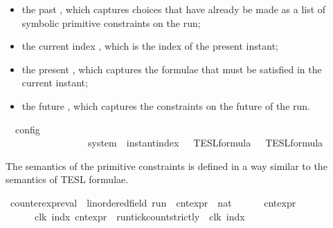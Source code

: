 \begin{isabellebody}
\begin{isamarkuptext}
%
\begin{itemize}%
\item the past \isa{{\isasymGamma}}, which captures choices that have already be made as a 
list of symbolic primitive constraints on the run;

\item the current index , which is the index of the present instant;

\item the present \isa{{\isasymPsi}}, which captures the formulae that must be satisfied
in the current instant;

\item the future \isa{{\isasymPhi}}, which captures the constraints on the future of the run.%
\end{itemize}%
\end{isamarkuptext}\isamarkuptrue%
\isamarkupfalse%
\ {\isacharprime}{\isasymtau}\ config\ {\isacharequal}\isanewline
\ \ \ \ \ \ \ \ \ \ \ \ \ \ \ \ {\isacartoucheopen}{\isacharprime}{\isasymtau}\ system\ {\isacharasterisk}\ instant{\isacharunderscore}index\ {\isacharasterisk}\ {\isacharprime}{\isasymtau}\ TESL{\isacharunderscore}formula\ {\isacharasterisk}\ {\isacharprime}{\isasymtau}\ TESL{\isacharunderscore}formula{\isacartoucheclose}%
\isadelimdocument
%
\endisadelimdocument
%
\isatagdocument
%
\isamarkuptrue%
%
\endisatagdocument
{\isafolddocument}%
%
\isadelimdocument
%
\endisadelimdocument
%
\begin{isamarkuptext}%
The semantics of the primitive constraints is defined in a way similar to
  the semantics of TESL formulae.%
\end{isamarkuptext}\isamarkuptrue%
\isamarkupfalse%
\ counter{\isacharunderscore}expr{\isacharunderscore}eval\ {\isacharcolon}{\isacharcolon}\ {\isacartoucheopen}{\isacharparenleft}{\isacharprime}{\isasymtau}{\isacharcolon}{\isacharcolon}linordered{\isacharunderscore}field{\isacharparenright}\ run\ {\isasymRightarrow}\ cnt{\isacharunderscore}expr\ {\isasymRightarrow}\ nat{\isacartoucheclose}\isanewline
\ \ {\isacharparenleft}{\isacartoucheopen}{\isasymlbrakk}\ {\isacharunderscore}\ {\isasymturnstile}\ {\isacharunderscore}\ {\isasymrbrakk}\isactrlsub c\isactrlsub n\isactrlsub t\isactrlsub e\isactrlsub x\isactrlsub p\isactrlsub r{\isacartoucheclose}{\isacharparenright}\isanewline
{}\isanewline
\ \ {\isacartoucheopen}{\isasymlbrakk}\ {\isasymrho}\ {\isasymturnstile}\ {\isacharhash}\isactrlsup {\isacharless}\ clk\ indx\ {\isasymrbrakk}\isactrlsub c\isactrlsub n\isactrlsub t\isactrlsub e\isactrlsub x\isactrlsub p\isactrlsub r\ {\isacharequal}\ run{\isacharunderscore}tick{\isacharunderscore}count{\isacharunderscore}strictly\ {\isasymrho}\ clk\ indx{\isacartoucheclose}\isanewline

\end{isabellebody}
